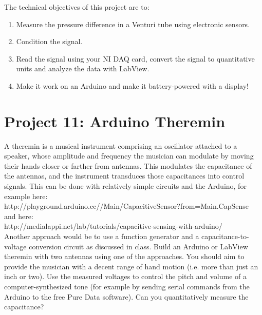 \documentclass[12pt]{article}
\begin{document}

\noindent The technical objectives of this project are to:
\begin{enumerate}
\item Measure the pressure difference in a Venturi tube using electronic sensors.
\item Condition the signal.
\item Read the signal using your NI DAQ card, convert the signal to quantitative units and analyze the data with LabView.
\item Make it work on an Arduino and make it battery-powered with a display!
\end{enumerate}

\newpage

\section*{Project 11: Arduino Theremin}

A theremin is a musical instrument comprising an oscillator attached to a speaker,
whose amplitude and frequency the musician can modulate by moving their hands 
closer or farther from antennas. 
This modulates the capacitance of the antennas, and the instrument transduces
those capacitances into control signals. 
This can be done with relatively simple circuits and the Arduino, for example here:\\

http://playground.arduino.cc//Main/CapacitiveSensor?from=Main.CapSense\\

and here:\\

http://medialappi.net/lab/tutorials/capacitive-sensing-with-arduino/\\

Another approach would be to use a function generator and a capacitance-to-voltage conversion circuit as discussed in class.
Build an Arduino or LabView theremin with two antennas using one of the approaches.
You should aim to provide the musician with a decent range of hand motion (i.e. more than just an inch or two). 
Use the measured voltages to control the pitch and volume of a computer-synthesized tone (for example by sending serial commands from the Arduino to the free Pure Data software). 
Can you quantitatively measure the capacitance? 
\end{document}
